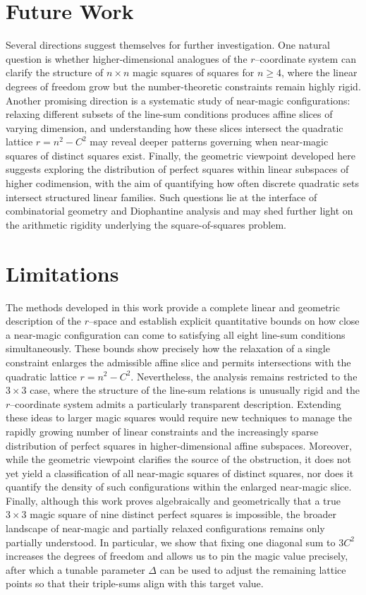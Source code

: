 \documentclass[12pt]{article}
\begin{document}
\section*{Future Work}

Several directions suggest themselves for further investigation.  One natural
question is whether higher-dimensional analogues of the $r$--coordinate system
can clarify the structure of $n\times n$ magic squares of squares for $n\ge 4$,
where the linear degrees of freedom grow but the number-theoretic constraints
remain highly rigid.  Another promising direction is a systematic study of
near-magic configurations: relaxing different subsets of the line-sum
conditions produces affine slices of varying dimension, and understanding how
these slices intersect the quadratic lattice $r=n^2-C^2$ may reveal deeper
patterns governing when near-magic squares of distinct squares exist.  Finally,
the geometric viewpoint developed here suggests exploring the distribution of
perfect squares within linear subspaces of higher codimension, with the aim of
quantifying how often discrete quadratic sets intersect structured linear
families.  Such questions lie at the interface of combinatorial geometry and
Diophantine analysis and may shed further light on the arithmetic rigidity
underlying the square-of-squares problem.

\section*{Limitations}

The methods developed in this work provide a complete linear and geometric
description of the $r$--space and establish explicit quantitative bounds on
how close a near-magic configuration can come to satisfying all eight
line-sum conditions simultaneously.  These bounds show precisely how the
relaxation of a single constraint enlarges the admissible affine slice and
permits intersections with the quadratic lattice $r=n^2-C^2$.  Nevertheless,
the analysis remains restricted to the $3\times 3$ case, where the structure
of the line-sum relations is unusually rigid and the $r$--coordinate system
admits a particularly transparent description.  Extending these ideas to
larger magic squares would require new techniques to manage the rapidly
growing number of linear constraints and the increasingly sparse distribution
of perfect squares in higher-dimensional affine subspaces.  Moreover, while
the geometric viewpoint clarifies the source of the obstruction, it does not
yet yield a classification of all near-magic squares of distinct squares, nor
does it quantify the density of such configurations within the enlarged
near-magic slice.  Finally, although this work proves algebraically and
geometrically that a true $3\times 3$ magic square of nine distinct perfect
squares is impossible, the broader landscape of near-magic and partially
relaxed configurations remains only partially understood.  In particular, we
show that fixing one diagonal sum to $3C^2$ increases the degrees of freedom
and allows us to pin the magic value precisely, after which a tunable
parameter $\Delta$ can be used to adjust the remaining lattice points so that
their triple-sums align with this target value.
\end{document}
